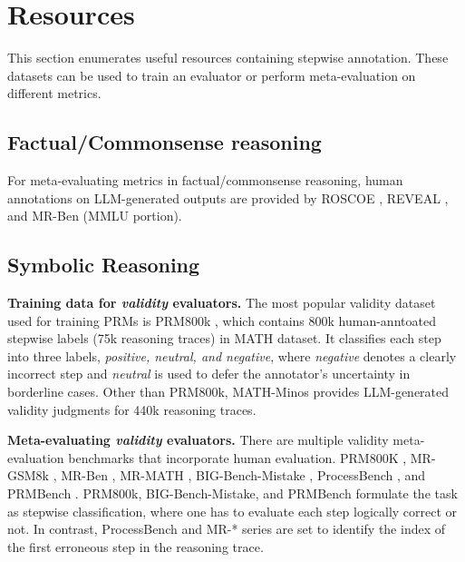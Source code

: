 \section{Resources}
\label{sec:appendix-resources}



This section enumerates useful resources containing stepwise annotation. These datasets can be used to train an evaluator or perform meta-evaluation on different metrics.


\subsection{Factual/Commonsense reasoning}


For meta-evaluating metrics in factual/commonsense reasoning, human annotations on LLM-generated outputs are provided by ROSCOE \citep{DBLP:conf/iclr/GolovnevaCPCZFC23}, REVEAL \citep{jacovi-etal-2024-chain}, and MR-Ben \citep{NEURIPS2024_d81cb1f4} (MMLU portion). %


\subsection{Symbolic Reasoning}


\textbf{Training data for \textit{validity} evaluators.} 
The most popular validity dataset used for training PRMs is PRM800k \citep{DBLP:conf/iclr/LightmanKBEBLLS24}, which contains 800k human-anntoated stepwise labels (75k reasoning traces) in MATH \citep{NEURIPSDnB2021_be83ab3e} dataset. It classifies each step into three labels, \textit{positive, neutral, and negative}, where \textit{negative} denotes a clearly incorrect step and \textit{neutral} is used to defer the annotator's uncertainty in borderline cases. Other than PRM800k, MATH-Minos \citep{gao2024llmcriticshelpcatch} provides LLM-generated validity judgments for 440k reasoning traces.

\textbf{Meta-evaluating \textit{validity} evaluators.} There are multiple validity meta-evaluation benchmarks that incorporate human evaluation. PRM800K \citep{DBLP:conf/iclr/LightmanKBEBLLS24}, MR-GSM8k \citep{zeng2024mrgsm8kmetareasoningbenchmarklarge}, MR-Ben \citep{NEURIPS2024_d81cb1f4}, MR-MATH \citep{xia2025evaluatingmathematicalreasoningaccuracy}, BIG-Bench-Mistake \citep{tyen-etal-2024-llms}, ProcessBench \citep{zheng2024processbenchidentifyingprocesserrors}, and PRMBench \citep{song2025prmbenchfinegrainedchallengingbenchmark}. PRM800k, BIG-Bench-Mistake, and PRMBench formulate the task as stepwise classification, where one has to evaluate each step logically correct or not. In contrast, ProcessBench and MR-* series are set to identify the index of the first erroneous step in the reasoning trace.

